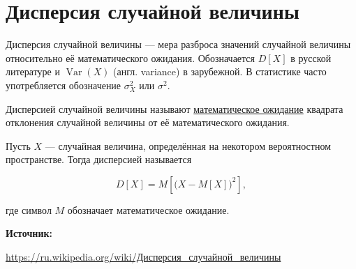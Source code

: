 \documentclass[12pt,a4paper]{scrartcl}
\begin{document}
	
\section{Дисперсия случайной величины}

Дисперсия случайной величины — мера разброса значений случайной величины относительно её математического ожидания. Обозначается $D[X]$ в русской литературе и $\operatorname {Var}(X)$ (англ. variance) в зарубежной. В статистике часто употребляется обозначение $\sigma _{X}^{2}$ или $\sigma ^{2}$. 

Дисперсией случайной величины называют \href{https://yatb.kksctf.ru/}{математическое ожидание} квадрата отклонения случайной величины от её математического ожидания.

Пусть $X$ — случайная величина, определённая на некотором вероятностном пространстве. Тогда дисперсией называется

$$D[X]=M\left[{\big (}X-M[X]{\big )}^{2}\right],$$

где символ $M$ обозначает математическое ожидание. 

\textbf{Источник:}

\href{https://ru.wikipedia.org/wiki/%D0%94%D0%B8%D1%81%D0%BF%D0%B5%D1%80%D1%81%D0%B8%D1%8F_%D1%81%D0%BB%D1%83%D1%87%D0%B0%D0%B9%D0%BD%D0%BE%D0%B9_%D0%B2%D0%B5%D0%BB%D0%B8%D1%87%D0%B8%D0%BD%D1%8B}{https://ru.wikipedia.org/wiki/Дисперсия\_случайной\_величины}
	
\end{document}
